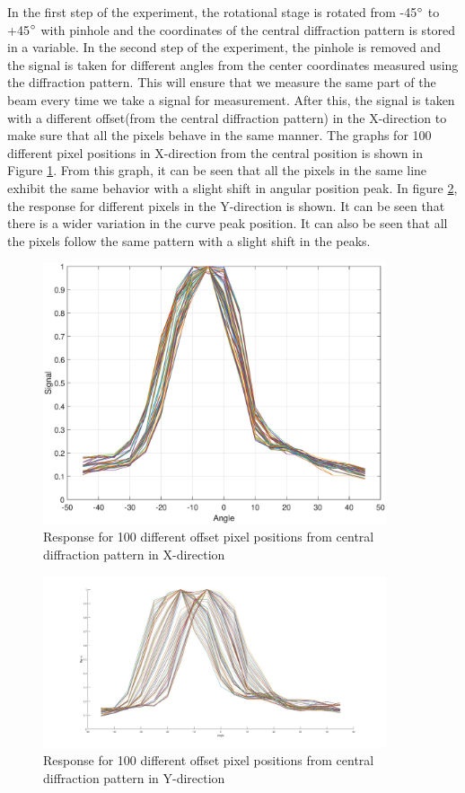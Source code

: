 In the first step of the experiment, the rotational stage is rotated from -45$\degree$ to +45$\degree$ with pinhole and the coordinates of the central diffraction pattern is stored in a variable. In the second step of the experiment, the pinhole is removed and the signal is taken for different angles from the center coordinates measured using the diffraction pattern. This will ensure that we measure the same part of the beam every time we take a signal for measurement. After this, the signal is taken with a different offset(from the central diffraction pattern) in the X-direction to make sure that all the pixels behave in the same manner. The graphs for 100 different pixel positions in X-direction from the central position is shown in Figure \ref{fig:offset_calib}. From this graph, it can be seen that all the pixels in the same line exhibit the same behavior with a slight shift in angular position peak. In figure \ref{fig:offset_calibY}, the response for different pixels in the Y-direction is shown. It can be seen that there is a wider variation in the curve peak position. It can also be seen that all the pixels follow the same pattern with a slight shift in the peaks.
\begin{figure}[!h]
\centering
\includegraphics[width = 0.90\textwidth]{pics/ResponseXOffset}
\caption{Response for 100 different offset pixel positions from central diffraction pattern in X-direction}
\label{fig:offset_calib}
\end{figure}

\begin{figure}[!h]
\centering
\includegraphics[width = 0.90\textwidth]{pics/ResponseYOffset}
\caption{Response for 100 different offset pixel positions from central diffraction pattern in Y-direction}
\label{fig:offset_calibY}
\end{figure}

